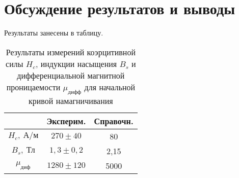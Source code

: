 \section{Обсуждение результатов и выводы}
Результаты занесены в таблицу.
\begin{table}[H]
    \begin{tabular}{|c|c|c|}
        \hline
        & Эксперим. & Справочн. \\
        \hline
        $H_c, \ \text{А/м}$ & $270 \pm
        40$
        & 80 \\ \hline
        $B_s, \ \text{Тл}$ & $1,3 \pm
        0,2$
        & 2,15 \\ \hline
        $\mu_\text{диф}$ & $1280 \pm 120$ &
        5000 \\  \hline
   \end{tabular}
    \captionsetup{justification=centering}
    \caption{Результаты измерений
    коэрцитивной силы $H_c$, индукции
насыщения $B_s$ и дифференциальной
магнитной проницаемости
$\mu_\text{дифф}$ для начальной кривой
намагничивания }
\end{table}




